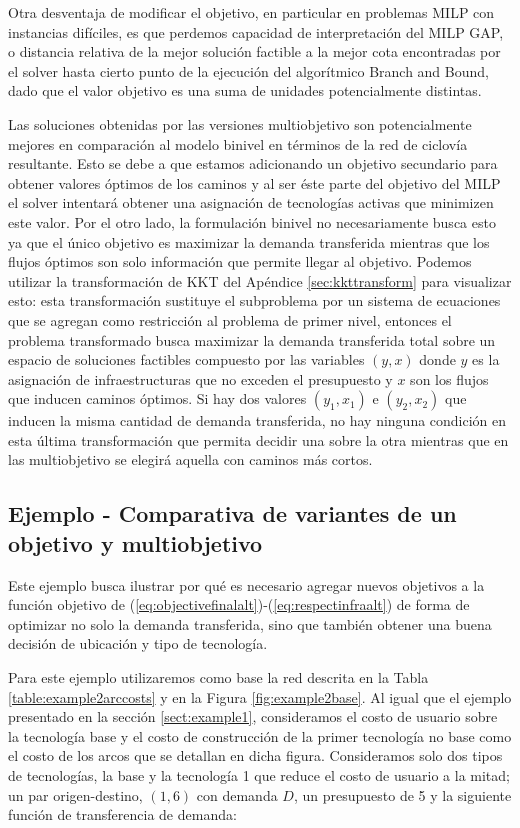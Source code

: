 Otra desventaja de modificar el objetivo, en particular en problemas MILP con instancias difíciles, es que perdemos capacidad de interpretación del MILP GAP, o distancia relativa de la mejor solución factible a la mejor cota encontradas por el solver hasta cierto punto de la ejecución del algorítmico Branch and Bound, dado que el valor objetivo es una suma de unidades potencialmente distintas.

Las soluciones obtenidas por las versiones multiobjetivo son potencialmente mejores en comparación al modelo binivel en términos de la red de ciclovía resultante. Esto se debe a que estamos adicionando un objetivo secundario para obtener valores óptimos de los caminos y al ser éste parte del objetivo del MILP el solver intentará obtener una asignación de tecnologías activas que minimizen este valor. Por el otro lado, la formulación binivel no necesariamente busca esto ya que el único objetivo es maximizar la demanda transferida mientras que los flujos óptimos son solo información que permite llegar al objetivo. Podemos utilizar la transformación de KKT del Apéndice \ref{sec:kkttransform} para visualizar esto: esta transformación sustituye el subproblema por un sistema de ecuaciones que se agregan como restricción al problema de primer nivel, entonces el problema transformado busca maximizar la demanda transferida total sobre un espacio de soluciones factibles compuesto por las variables $(y, x)$ donde $y$ es la asignación de infraestructuras que no exceden el presupuesto y $x$ son los flujos que inducen caminos óptimos. Si hay dos valores $(y_1, x_1)$ e $(y_2, x_2)$ que inducen la misma cantidad de demanda transferida, no hay ninguna condición en esta última transformación que permita decidir una sobre la otra mientras que en las multiobjetivo se elegirá aquella con caminos más cortos.

\subsection{Ejemplo - Comparativa de variantes de un objetivo y multiobjetivo}
\label{sect:example2}

Este ejemplo busca ilustrar por qué es necesario agregar nuevos objetivos a la función objetivo de (\ref{eq:objectivefinalalt})-(\ref{eq:respectinfraalt}) de forma de optimizar no solo la demanda transferida, sino que también obtener una buena decisión de ubicación y tipo de tecnología.

Para este ejemplo utilizaremos como base la red descrita en la Tabla \ref{table:example2arccosts} y en la Figura \ref{fig:example2base}. Al igual que el ejemplo presentado en la sección \ref{sect:example1}, consideramos el costo de usuario sobre la tecnología base y el costo de construcción de la primer tecnología no base como el costo de los arcos que se detallan en dicha figura. Consideramos solo dos tipos de tecnologías, la base y la tecnología 1 que reduce el costo de usuario a la mitad; un par origen-destino, $(1, 6)$ con demanda $D$, un presupuesto de 5 y la siguiente función de transferencia de demanda:

